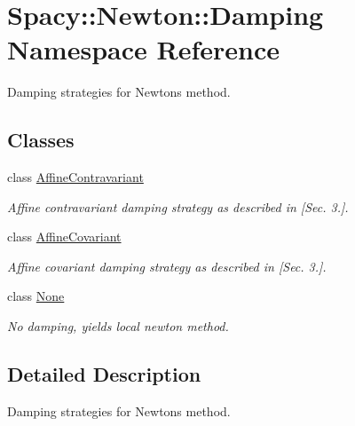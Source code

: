 \hypertarget{namespaceSpacy_1_1Newton_1_1Damping}{}\section{Spacy\+:\+:Newton\+:\+:Damping Namespace Reference}
\label{namespaceSpacy_1_1Newton_1_1Damping}


Damping strategies for Newton\textquotesingle{}s method.  


\subsection*{Classes}
\begin{DoxyCompactItemize}
\item 
class \hyperlink{classSpacy_1_1Newton_1_1Damping_1_1AffineContravariant}{Affine\+Contravariant}
\begin{DoxyCompactList}\small\item\em Affine contravariant damping strategy as described in \cite{Deuflhard2004} \mbox{[}Sec. 3.\mbox{]}. \end{DoxyCompactList}\item 
class \hyperlink{classSpacy_1_1Newton_1_1Damping_1_1AffineCovariant}{Affine\+Covariant}
\begin{DoxyCompactList}\small\item\em Affine covariant damping strategy as described in \cite{Deuflhard2004} \mbox{[}Sec. 3.\mbox{]}. \end{DoxyCompactList}\item 
class \hyperlink{classSpacy_1_1Newton_1_1Damping_1_1None}{None}
\begin{DoxyCompactList}\small\item\em No damping, yields local newton method. \end{DoxyCompactList}\end{DoxyCompactItemize}


\subsection{Detailed Description}
Damping strategies for Newton\textquotesingle{}s method. 